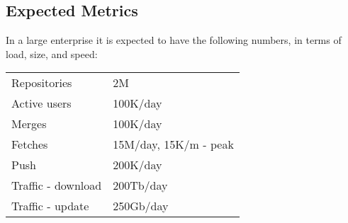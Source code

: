 \documentclass[12pt,oneside]{article}
\begin{document}
\subsection{Expected Metrics}
\label{ref:metrics}

In a large enterprise it is expected to have the following
numbers, in terms of load, size, and speed:

\begin{tabular}{ll}
  Repositories & 2M \\
  Active users & 100K/day \\
  Merges & 100K/day \\
  Fetches & 15M/day, 15K/m - peak \\
  Push & 200K/day \\
  Traffic - download & 200Tb/day \\
  Traffic - update & 250Gb/day \\
\end{tabular}

\printbibliography%
\end{document}
